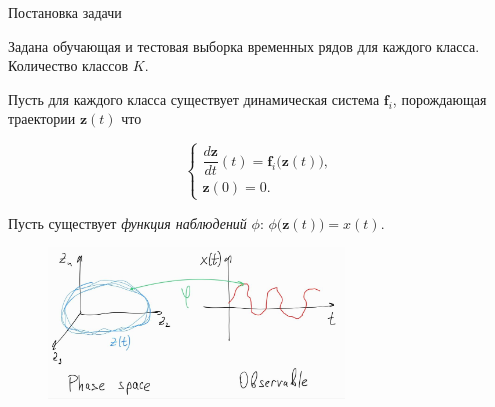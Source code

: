 \documentclass[10pt]{beamer}
\theoremstyle{definition}
\begin{document}
	\begin{frame}{Постановка задачи}
		
		Задана обучающая и тестовая выборка временных рядов для каждого класса. Количество классов $K$.
		
		Пусть для каждого класса существует динамическая система $\textbf{f}_i$, порождающая траектории $\textbf{z}(t)$ что
		
		\begin{equation*}
			\begin{cases}
				\dfrac{d \textbf{z}}{dt} (t) = \textbf{f}_i \big( \textbf{z}(t) \big), \\
				\textbf{z}(0) = 0.
			\end{cases}
		\end{equation*}
		
		Пусть существует \emph{функция наблюдений} $\phi$: $\phi\big( \textbf{z}(t) \big) = x(t)$.
		
		\begin{figure}
			\centering
			\includegraphics[width=0.7\textwidth,keepaspectratio]{img/phi_func.png}
		\end{figure}
		
	\end{frame}	
	
\end{document}

